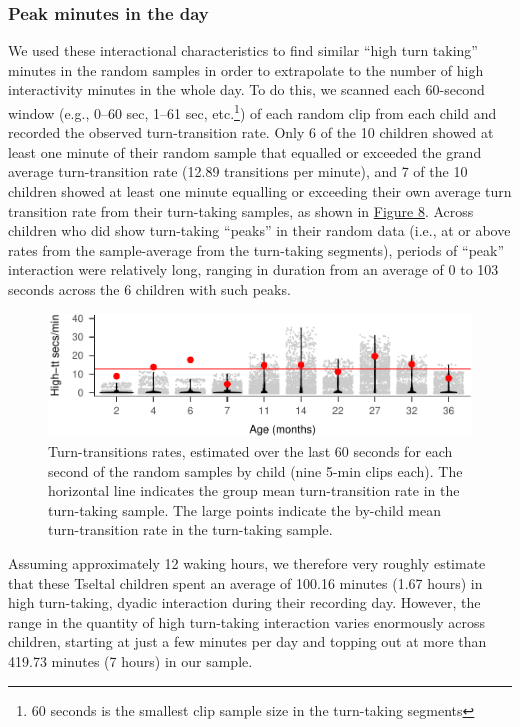 \documentclass[floatsintext,man]{apa6}
\theoremstyle{definition}
\theoremstyle{definition}
\theoremstyle{definition}
\theoremstyle{remark}
\begin{document}
\subsubsection{Peak minutes in the day}\label{peak-minutes-in-the-day}

We used these interactional characteristics to find similar
\enquote{high turn taking} minutes in the random samples in order to
extrapolate to the number of high interactivity minutes in the whole
day. To do this, we scanned each 60-second window (e.g., 0--60 sec,
1--61 sec, etc.\footnote{60 seconds is the smallest clip sample size in
  the turn-taking segments}) of each random clip from each child and
recorded the observed turn-transition rate. Only 6 of the 10 children
showed at least one minute of their random sample that equalled or
exceeded the grand average turn-transition rate (12.89 transitions per
minute), and 7 of the 10 children showed at least one minute equalling
or exceeding their own average turn transition rate from their
turn-taking samples, as shown in \protect\hyperlink{fig8}{Figure 8}.
Across children who did show turn-taking \enquote{peaks} in their random
data (i.e., at or above rates from the sample-average from the
turn-taking segments), periods of \enquote{peak} interaction were
relatively long, ranging in duration from an average of 0 to 103 seconds
across the 6 children with such peaks.

\begin{figure}
\centering
\includegraphics{Tseltal-CLE_files/figure-latex/fig8-1.pdf}
\caption{\label{fig:fig8}Turn-transitions rates, estimated over the last 60
seconds for each second of the random samples by child (nine 5-min clips
each). The horizontal line indicates the group mean turn-transition rate
in the turn-taking sample. The large points indicate the by-child mean
turn-transition rate in the turn-taking sample.}
\end{figure}

Assuming approximately 12 waking hours, we therefore very roughly
estimate that these Tseltal children spent an average of 100.16 minutes
(1.67 hours) in high turn-taking, dyadic interaction during their
recording day. However, the range in the quantity of high turn-taking
interaction varies enormously across children, starting at just a few
minutes per day and topping out at more than 419.73 minutes (7 hours) in
our sample.
\end{document}
